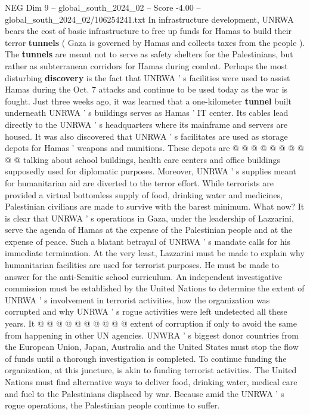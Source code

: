 \begin{textsample}{NEG Dim 9 – global\_south\_2024\_02 – Score -4.00 – global\_south\_2024\_02/106254241.txt}
In infrastructure development, UNRWA bears the cost of basic infrastructure to free up funds for Hamas to build their terror \textbf{tunnels} ( Gaza is governed by Hamas and collects taxes from the people ).
The \textbf{tunnels} are meant not to serve as safety shelters for the Palestinians, but rather as subterranean corridors for Hamas during combat.
Perhaps the most disturbing \textbf{discovery} is the fact that UNRWA ' s facilities were used to assist Hamas during the Oct. 7 attacks and continue to be used today as the war is fought.
Just three weeks ago, it was learned that a one-kilometer \textbf{tunnel} built underneath UNRWA ' s buildings serves as Hamas ' IT center.
Its cables lead directly to the UNRWA ' s headquarters where its mainframe and servers are housed.
It was also discovered that UNRWA ' s facilitates are used as storage depots for Hamas ' weapons and munitions.
These depots are @ @ @ @ @ @ @ @ @ @ talking about school buildings, health care centers and office buildings supposedly used for diplomatic purposes.
Moreover, UNRWA ' s supplies meant for humanitarian aid are diverted to the terror effort.
While terrorists are provided a virtual bottomless supply of food, drinking water and medicines, Palestinian civilians are made to survive with the barest minimum.
What now?
It is clear that UNRWA ' s operations in Gaza, under the leadership of Lazzarini, serve the agenda of Hamas at the expense of the Palestinian people and at the expense of peace.
Such a blatant betrayal of UNRWA ' s mandate calls for his immediate termination.
At the very least, Lazzarini must be made to explain why humanitarian facilities are used for terrorist purposes.
He must be made to answer for the anti-Semitic school curriculum.
An independent investigative commission must be established by the United Nations to determine the extent of UNRWA ' s involvement in terrorist activities, how the organization was corrupted and why UNRWA ' s rogue activities were left undetected all these years.
It @ @ @ @ @ @ @ @ @ @ extent of corruption if only to avoid the same from happening in other UN agencies.
UNWRA ' s biggest donor countries from the European Union, Japan, Australia and the United States must stop the flow of funds until a thorough investigation is completed.
To continue funding the organization, at this juncture, is akin to funding terrorist activities.
The United Nations must find alternative ways to deliver food, drinking water, medical care and fuel to the Palestinians displaced by war.
Because amid the UNRWA ' s rogue operations, the Palestinian people continue to suffer.

\end{textsample}
